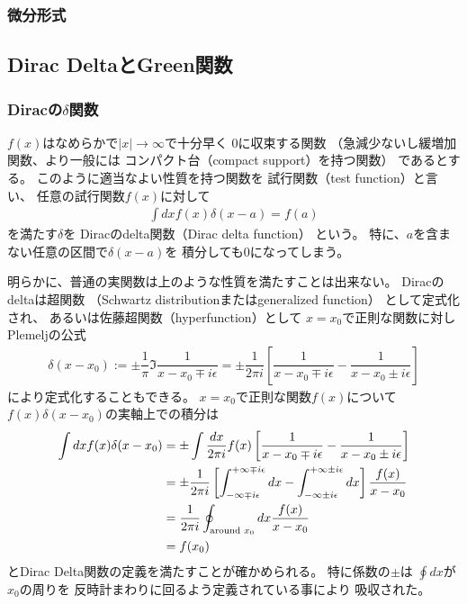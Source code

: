 \subsubsection{微分形式}

\newpage
\subsection{Dirac DeltaとGreen関数}

\subsubsection{Diracの$\delta$関数}

$f(x)$はなめらかで$|x| \to \infty$で十分早く
$0$に収束する関数
（急減少ないし緩増加関数、より一般には
コンパクト台（compact support）を持つ関数）
であるとする。
このように適当なよい性質を持つ関数を
試行関数（test function）と言い、
任意の試行関数$f(x)$に対して
\begin{align}
    \int dx f(x) \delta(x - a)
    =
    f(a)
\end{align}
を満たす$\delta$を
Diracのdelta関数（Dirac delta function）
という。
特に、$a$を含まない任意の区間で$\delta(x - a)$を
積分しても$0$になってしまう。

明らかに、普通の実関数は上のような性質を満たすことは出来ない。
Diracのdeltaは超関数
（Schwartz distributionまたはgeneralized function）
として定式化され、
あるいは佐藤超関数（hyperfunction）として
$x = x_0$で正則な関数に対し
Plemeljの公式
\begin{align}
    \delta(x - x_0)
:=
    \pm
    \dfrac{1}{\pi}
    \Im
    \dfrac{1}{x - x_0 \mp i \epsilon}
=
    \pm
    \dfrac{1}{2 \pi i}
    \left[
        \dfrac{1}{x - x_0 \mp i \epsilon}
        -
        \dfrac{1}{x - x_0 \pm i \epsilon}
    \right]
\end{align}
により定式化することもできる。
$x = x_0$で正則な関数$f(x)$について
$f(x) \delta(x - x_0)$の実軸上での積分は
\begin{align}
    \int dx
    f(x) \delta(x - x_0)
&=
    \pm
    \int
    \dfrac{dx}{2 \pi i}
    f(x)
    \left[
        \dfrac{1}{x - x_0 \mp i \epsilon}
        -
        \dfrac{1}{x - x_0 \pm i \epsilon}
    \right]
\notag\\&
=
    \pm
    \dfrac{1}{2 \pi i}
    \left[
    \int_{- \infty \mp i \epsilon}
        ^{+ \infty \mp i \epsilon}
        dx
    -
    \int_{- \infty \pm i \epsilon}
        ^{+ \infty \pm i \epsilon}
        dx
    \right]
    \dfrac{f(x)}{x - x_0}
\notag\\&
=
    \dfrac{1}{2 \pi i}
    \oint_{\text{around } x_0}
        dx
    \dfrac{f(x)}{x - x_0}
\notag\\&
=
    f(x_0)
\end{align}
とDirac Delta関数の定義を満たすことが確かめられる。
特に係数の$\pm$は
$\oint dx$が$x_0$の周りを
反時計まわりに回るよう定義されている事により
吸収された。

